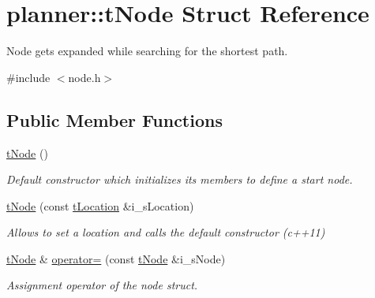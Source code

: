 \hypertarget{structplanner_1_1t_node}{}\section{planner\+:\+:t\+Node Struct Reference}
\label{structplanner_1_1t_node}


Node gets expanded while searching for the shortest path.  




{\ttfamily \#include $<$node.\+h$>$}

\subsection*{Public Member Functions}
\begin{DoxyCompactItemize}
\item 
\mbox{\hyperlink{structplanner_1_1t_node_a83ff217ef060b93698045b2357999594}{t\+Node}} ()
\begin{DoxyCompactList}\small\item\em Default constructor which initializes its members to define a start node. \end{DoxyCompactList}\item 
\mbox{\label{structplanner_1_1t_node_a6728fd921145674d77dec553aad10824}} 
\mbox{\hyperlink{structplanner_1_1t_node_a6728fd921145674d77dec553aad10824}{t\+Node}} (const \mbox{\hyperlink{structplanner_1_1t_location}{t\+Location}} \&i\+\_\+s\+Location)
\begin{DoxyCompactList}\small\item\em Allows to set a location and calls the default constructor (c++11) \end{DoxyCompactList}\item 
\mbox{\label{structplanner_1_1t_node_abcbfb81ac371e43234f66072547af049}} 
\mbox{\hyperlink{structplanner_1_1t_node}{t\+Node}} \& \mbox{\hyperlink{structplanner_1_1t_node_abcbfb81ac371e43234f66072547af049}{operator=}} (const \mbox{\hyperlink{structplanner_1_1t_node}{t\+Node}} \&i\+\_\+s\+Node)
\begin{DoxyCompactList}\small\item\em Assignment operator of the node struct. \end{DoxyCompactList}\item 
\mbox{\label{structplanner_1_1t_node_a18891f54e73f974f1142fba95887de98}} 

\end{DoxyCompactItemize}
